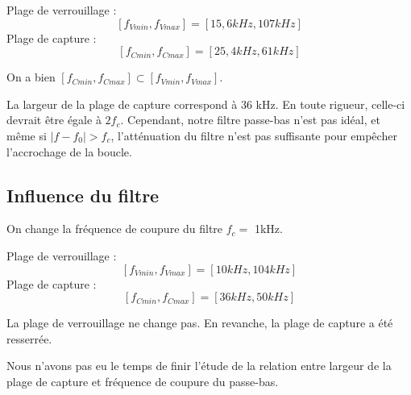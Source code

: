 \documentclass[../../Cours_M1.tex]{subfiles}
\begin{document}
\begin{multicols}{2}
Plage de verrouillage :
\[ [f_{Vmin} , f_{Vmax} ] = [15,6 kHz,107kHz ]\]
Plage de capture :
\[ [f_{Cmin} , f_{Cmax} ] = [25,4 kHz,61kHz ]\]
\end{multicols}

On a bien  $ [f_{Cmin} , f_{Cmax} ] \subset [f_{Vmin} , f_{Vmax} ]$.

La largeur de la plage de capture correspond à 36 kHz. En toute rigueur, celle-ci devrait être égale à $2f_c$. Cependant, notre filtre passe-bas n'est pas idéal, et même si $|f-f_0| > f_c$, l'atténuation du filtre n'est pas suffisante pour empêcher l'accrochage de la boucle.

\subsection{Influence du filtre}

On change la fréquence de coupure du filtre $f_c =$ 1kHz.
\begin{multicols}{2}
Plage de verrouillage :
\[ [f_{Vmin} , f_{Vmax} ] = [10 kHz,104kHz ]\]
Plage de capture :
\[ [f_{Cmin} , f_{Cmax} ] = [36 kHz,50kHz ]\]
\end{multicols}

La plage de verrouillage ne change pas. En revanche, la plage de capture a été resserrée.

Nous n'avons pas eu le temps de finir l'étude de la relation entre largeur de la plage de capture et fréquence de coupure du passe-bas.
\end{document}
